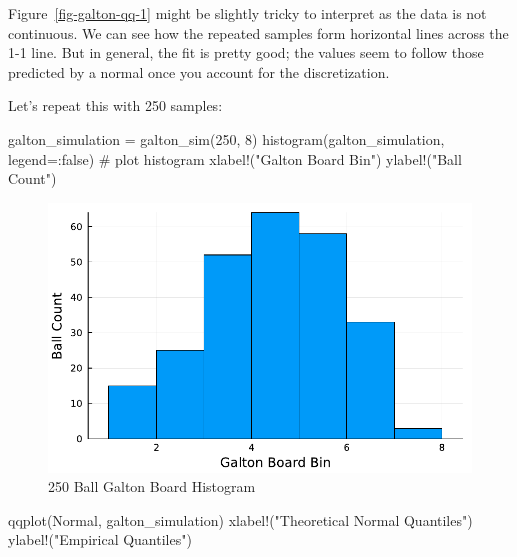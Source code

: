 \documentclass[
  letterpaper,
  DIV=11,
  numbers=noendperiod]{scrartcl}
\newenvironment{Shaded}{\begin{snugshade}}{\end{snugshade}}
\newcommand{\CommentTok}[1]{\textcolor[rgb]{0.37,0.37,0.37}{#1}}
\newcommand{\ConstantTok}[1]{\textcolor[rgb]{0.56,0.35,0.01}{#1}}
\newcommand{\FloatTok}[1]{\textcolor[rgb]{0.68,0.00,0.00}{#1}}
\newcommand{\FunctionTok}[1]{\textcolor[rgb]{0.28,0.35,0.67}{#1}}
\newcommand{\NormalTok}[1]{\textcolor[rgb]{0.00,0.23,0.31}{#1}}
\newcommand{\OperatorTok}[1]{\textcolor[rgb]{0.37,0.37,0.37}{#1}}
\newcommand{\StringTok}[1]{\textcolor[rgb]{0.13,0.47,0.30}{#1}}
\begin{document}
Figure~\ref{fig-galton-qq-1} might be slightly tricky to interpret as
the data is not continuous. We can see how the repeated samples form
horizontal lines across the 1-1 line. But in general, the fit is pretty
good; the values seem to follow those predicted by a normal once you
account for the discretization.

Let's repeat this with 250 samples:

\begin{Shaded}
\begin{Highlighting}[]
\NormalTok{galton\_simulation }\OperatorTok{=} \FunctionTok{galton\_sim}\NormalTok{(}\FloatTok{250}\NormalTok{, }\FloatTok{8}\NormalTok{)}
\FunctionTok{histogram}\NormalTok{(galton\_simulation, legend}\OperatorTok{=:}\ConstantTok{false}\NormalTok{) }\CommentTok{\# plot histogram}
\FunctionTok{xlabel!}\NormalTok{(}\StringTok{"Galton Board Bin"}\NormalTok{)}
\FunctionTok{ylabel!}\NormalTok{(}\StringTok{"Ball Count"}\NormalTok{)}
\end{Highlighting}
\end{Shaded}

\begin{figure}[H]

{\centering \includegraphics{hw01_files/mediabag/hw01_files/figure-pdf/cell-17-output-1.pdf}

}

\caption{250 Ball Galton Board Histogram}

\end{figure}%

\begin{Shaded}
\begin{Highlighting}[]
\FunctionTok{qqplot}\NormalTok{(Normal, galton\_simulation)}
\FunctionTok{xlabel!}\NormalTok{(}\StringTok{"Theoretical Normal Quantiles"}\NormalTok{)}
\FunctionTok{ylabel!}\NormalTok{(}\StringTok{"Empirical Quantiles"}\NormalTok{)}
\end{Highlighting}
\end{Shaded}
\end{document}
